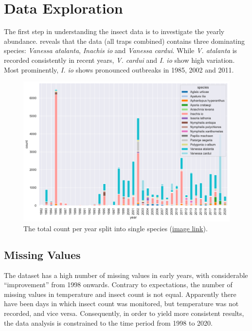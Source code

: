 \section{Data Exploration}

The first step in understanding the insect data is to investigate the yearly abundance.  reveals that the data (all traps combined) contains three dominating species: \textit{Vanessa atalanta}, \textit{Inachis io} and \textit{Vanessa cardui}. While \textit{V. atalanta} is recorded consistently in recent years, \textit{V. cardui} and \textit{I. io} show high variation. Most prominently, \textit{I. io} shows pronounced outbreaks in 1985, 2002 and 2011.

\begin{figure}[H]
	\centering
	\includegraphics[width=0.9\linewidth]{figs/total-count_per_year_per_species}
	\caption{The total count per year split into single species (\href{https://github.com/gtlab-barcelona/Robert/blob/main/data-exploration_first-last/figs/total-count_per_year_per_species.pdf}{image link}).}
	\label{fig:total-count}
\end{figure}

\subsection{Missing Values}\label{sec:nans}

The dataset has a high number of missing values in early years, with considerable \enquote{improvement} from 1998 onwards. Contrary to expectations, the number of missing values in temperature and insect count is not equal. Apparently there have been days in which insect count was monitored, but temperature was not recorded, and vice versa.
Consequently, in order to yield more consistent results, the data analysis is constrained to the time period from 1998 to 2020.

